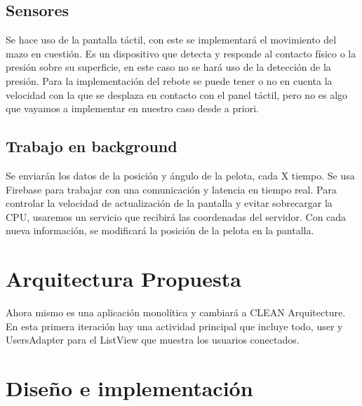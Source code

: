 \documentclass[a4paper,openright,12pt]{article}
\begin{document}
\subsection{Sensores}
Se hace uso de la pantalla táctil, con este se implementará el movimiento del mazo en cuestión. Es un dispositivo que detecta y responde al contacto físico o la presión sobre su superficie, en este caso no se hará uso de la detección de la presión. Para la implementación del rebote se puede tener o no en cuenta la velocidad con la que se desplaza en contacto con el panel táctil, pero no es algo que vayamos a implementar en nuestro caso desde a priori.
\subsection{Trabajo en background}
Se enviarán los datos de la posición y ángulo de la pelota, cada X tiempo. Se usa Firebase para trabajar con una comunicación y latencia en tiempo real. Para controlar la velocidad de actualización de la pantalla y evitar sobrecargar la CPU, usaremos un servicio que recibirá las coordenadas del servidor. Con cada nueva información, se modificará la posición de la pelota en la pantalla.

\section{Arquitectura Propuesta}
Ahora mismo es una aplicación monolítica y cambiará a CLEAN Arquitecture. En esta primera iteración hay una actividad principal que incluye todo, user y UsersAdapter para el ListView que muestra los usuarios conectados. 

\section{Diseño e implementación}
\end{document}
